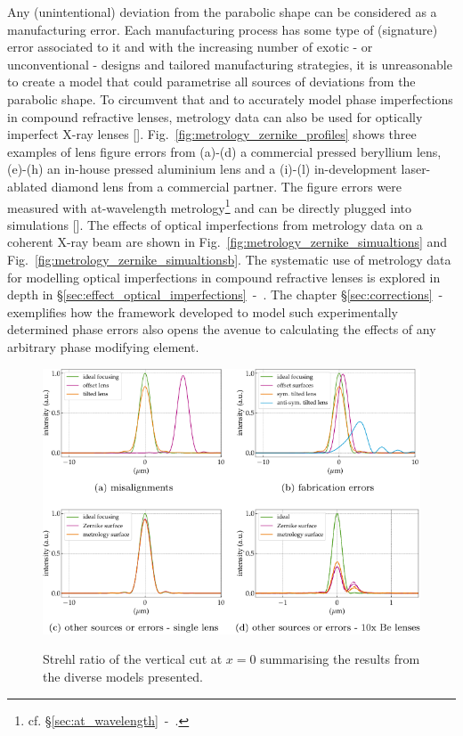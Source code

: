 \begin{refsection}
Any (unintentional) deviation from the parabolic shape can be considered as a manufacturing error. Each manufacturing process has some type of (signature) error associated to it and with the increasing number of exotic - or unconventional - designs and tailored manufacturing strategies, it is unreasonable to create a model that could parametrise all sources of deviations from the parabolic shape. To circumvent that and to accurately model phase imperfections in compound refractive lenses, metrology data can also be used for optically imperfect X-ray lenses [\cite{Celestre2020, Chubar2020}]. Fig.~\ref{fig:metrology_zernike_profiles} shows three examples of lens figure errors from (a)-(d) a commercial pressed beryllium lens, (e)-(h) an in-house pressed aluminium lens and a (i)-(l) in-development laser-ablated diamond lens from a commercial partner. The figure errors were measured with at-wavelength metrology\footnote{cf. \S\ref{sec:at_wavelength}~-~\textit{}.} and can be directly plugged into simulations [\cite{Celestre2020}]. The effects of optical imperfections from metrology data on a coherent X-ray beam are shown in Fig.~\ref{fig:metrology_zernike_simualtions} and Fig.~\ref{fig:metrology_zernike_simualtionsb}. The systematic use of metrology data for modelling optical imperfections in compound refractive lenses is explored in depth in \S\ref{sec:effect_optical_imperfections}~-~\textit{}. The chapter \S\ref{sec:corrections}~-~\textit{} exemplifies how the framework developed to model such experimentally determined phase errors also opens the avenue to calculating the effects of any arbitrary phase modifying element.

\begin{figure}[t]
        \centering
        {\includegraphics[width=0.75\linewidth]{figures/ch04/Strehl}}
        \caption[Strehl ratio summarising the results from the diverse models presented]{Strehl ratio of the vertical cut at $x=0$ summarising the results from the diverse models presented.} \label{fig:Strehl_m}
\end{figure}

\end{refsection}
